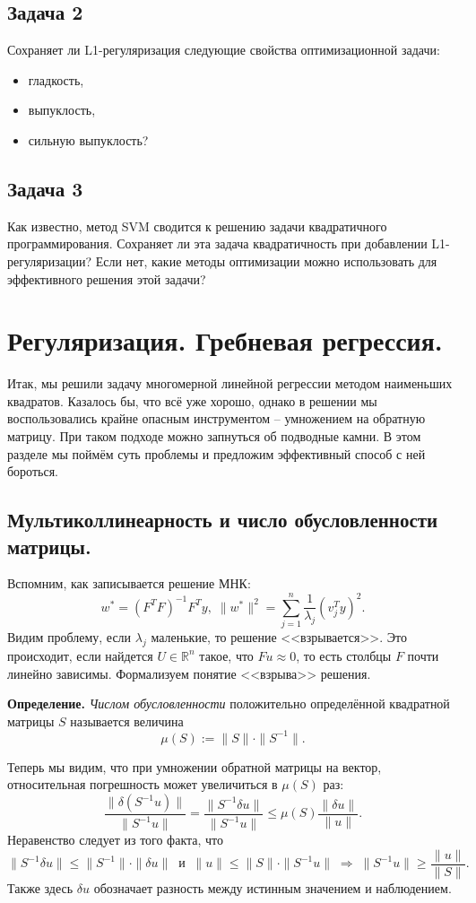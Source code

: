 \subsection*{Задача 2}
Сохраняет ли L1-регуляризация следующие свойства оптимизационной задачи:
\begin{itemize}
  \item гладкость,
  \item выпуклость,
  \item сильную выпуклость?
\end{itemize}

\subsection*{Задача 3}
Как известно, метод SVM сводится к решению задачи квадратичного программирования. Сохраняет ли эта задача квадратичность при добавлении L1-регуляризации? Если нет, какие методы оптимизации можно использовать для эффективного решения этой задачи?

\section*{Регуляризация. Гребневая регрессия.}

Итак, мы решили задачу многомерной линейной регрессии методом наименьших квадратов. Казалось бы, что всё уже хорошо, однако в решении мы воспользовались крайне опасным инструментом -- умножением на обратную матрицу. При таком подходе можно запнуться об подводные камни. В этом разделе мы поймём суть проблемы и предложим эффективный способ с ней бороться.

\subsection*{Мультиколлинеарность и число обусловленности матрицы.}
Вспомним, как записывается решение МНК:
$$w^* = (F^T F)^{-1} F^T y, \; \|w^*\|^2 = \sum_{j=1}^n \frac{1}{\lambda_j}(v_j^T y)^2.$$
Видим проблему, если $\lambda_j$ маленькие, то решение <<взрывается>>. Это происходит, если найдется $U \in \mathbb{R}^n$ такое, что $Fu \approx 0$, то есть столбцы $F$ почти линейно зависимы. Формализуем понятие <<взрыва>> решения.

\noindent\textbf{Определение.} \textit{Числом обусловленности}
положительно определённой квадратной матрицы $S$ называется величина
$$\mu(S) := \|S\| \cdot \|S^{-1}\|.$$

Теперь мы видим, что при умножении обратной матрицы на вектор, относительная погрешность может увеличиться в $\mu(S)$ раз:
$$\frac{\|\delta(S^{-1}u)\|}{\|S^{-1}u\|} = \frac{\|S^{-1} \delta u\|}{\|S^{-1}u\|} \leqslant \mu(S)\frac{\|\delta u\|}{\|u\|}.$$
Неравенство следует из того факта, что
$$\|S^{-1}\delta u\| \leqslant \|S^{-1}\| \cdot \|\delta u\| \;\; \text{и} \;\; \|u\| \leqslant \|S\| \cdot \|S^{-1}u\| \; \Rightarrow \; \|S^{-1}u\| \geqslant \frac{\|u\|}{\|S\|}.$$
Также здесь $\delta u$ обозначает разность между истинным значением и наблюдением.

